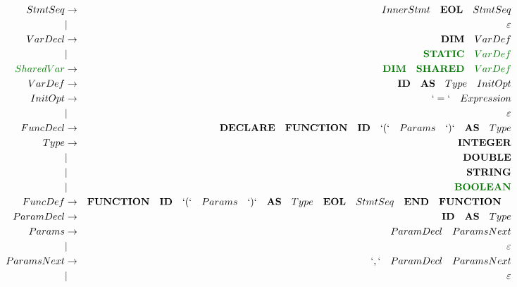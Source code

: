 \documentclass[a4paper,11pt,landscape,leqno]{article}
\begin{document}
\begin{eqnarray}
StmtSeq		&	 \rightarrow	& InnerStmt\quad \textbf{EOL}\quad StmtSeq	 \\
			&		|			& \varepsilon \\
VarDecl		& \rightarrow		& \textbf{DIM}\quad VarDef \\
			&		|			& \textcolor{green1}{\textbf{STATIC}\quad VarDef} \\
\textcolor{green1}{SharedVar}&		 \rightarrow		   & \textcolor{green1}{\textbf{DIM}\quad \textbf{SHARED}\quad VarDef} \\
VarDef		& \rightarrow		& \textbf{ID}\quad \textbf{AS}\quad Type \quad InitOpt\\
InitOpt		&	   \rightarrow	& `=`\quad Expression \\
			&		|			& \varepsilon \\
FuncDecl	&  \rightarrow		& \textbf{DECLARE}\quad \textbf{FUNCTION}\quad \textbf{ID}\quad `(` \quad Params \quad`)`\quad \textbf{AS}\quad Type   \\
Type		&	 \rightarrow	&	 \textbf{INTEGER}	 \\
			&		|			& \textbf{DOUBLE}	\\
			&		|			& \textbf{STRING}	\\
			&		|			& \textcolor{green1}{\textbf{BOOLEAN}}	\\
	FuncDef    &	\rightarrow    & \textbf{FUNCTION}\quad \textbf{ID}\quad `(`\quad Params\quad `)`\quad \textbf{AS}\quad Type\quad \textbf{EOL}\quad StmtSeq\quad \textbf{END}\quad \textbf{FUNCTION}\quad \\
ParamDecl	&	\rightarrow   & {\textbf{ID}\quad \textbf{AS}\quad Type}	\\
Params		&	 \rightarrow	& {ParamDecl}\quad ParamsNext  \\
			&	 |				& \varepsilon			  \\
ParamsNext	&	 \rightarrow	& `,`\quad {ParamDecl}\quad  ParamsNext   \\
			&	 |				& \varepsilon			  \\

\end{eqnarray}
\end{document}
